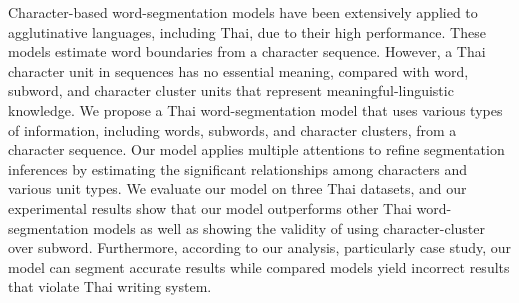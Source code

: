 Character-based word-segmentation models have been extensively applied to agglutinative languages, including Thai, due to their high performance. 
%
These models estimate word boundaries from a character sequence.
%
However, a Thai character unit in sequences has no essential meaning, compared with word, subword, and character cluster units that represent meaningful-linguistic knowledge.
%
We propose a Thai word-segmentation model that uses various types of information, including words, subwords, and character clusters, from a character sequence.
%
Our model applies multiple attentions to refine segmentation inferences by estimating the significant relationships among characters and various unit types.
%
We evaluate our model on three Thai datasets, and our experimental results show that our model outperforms other Thai word-segmentation models as well as showing the validity of using character-cluster over subword.
%
Furthermore, according to our analysis, particularly case study, our model can segment accurate results while compared models yield incorrect results that violate Thai writing system.